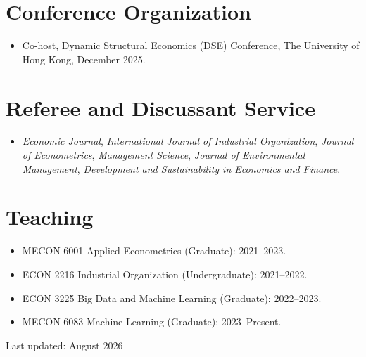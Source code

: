 \documentclass[11pt]{article}
\begin{document}
\section*{Conference Organization}
\begin{itemize}[leftmargin=*,itemsep=0pt,parsep=0pt,topsep=1pt]
  \item Co-host, Dynamic Structural Economics (DSE) Conference, The University of Hong Kong, December 2025.
\end{itemize}

\section*{Referee and Discussant Service}
\begin{itemize}[leftmargin=*,itemsep=0pt,parsep=0pt,topsep=1pt]
  \item \textit{Economic Journal}, \textit{International Journal of Industrial Organization}, \textit{Journal of Econometrics}, \textit{Management Science}, \textit{Journal of Environmental Management}, \textit{Development and Sustainability in Economics and Finance}.
\end{itemize}

\section*{Teaching}
\begin{itemize}[leftmargin=*,itemsep=0pt,parsep=0pt,topsep=1pt]
  \item MECON 6001 Applied Econometrics (Graduate): 2021--2023.
  \item ECON 2216 Industrial Organization (Undergraduate): 2021--2022.
  \item ECON 3225 Big Data and Machine Learning (Graduate): 2022--2023.
  \item MECON 6083 Machine Learning (Graduate): 2023--Present.
\end{itemize}

\vfill
\begin{flushright}
\small\textcolor{muted}{Last updated: August 2026}
\end{flushright}
\end{document}
